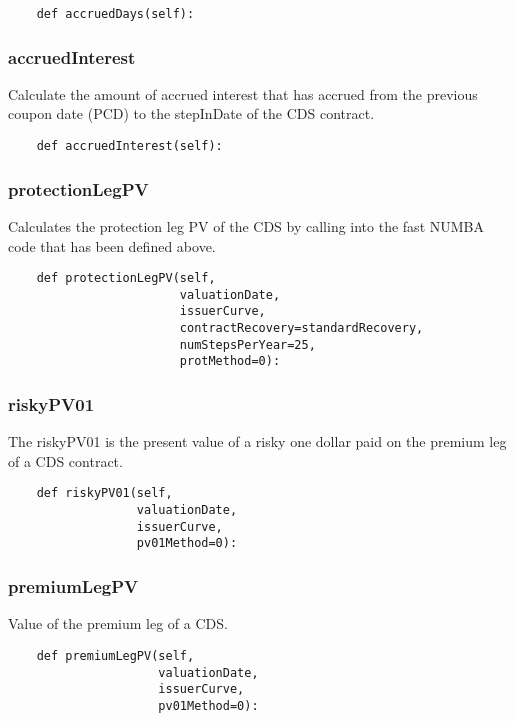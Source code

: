\documentclass[twoside,11pt]{book}
\begin{document}
\begin{lstlisting}
    def accruedDays(self):
\end{lstlisting}

\subsubsection*{{\bf accruedInterest}}
Calculate the amount of accrued interest that has accrued from the previous coupon date (PCD) to the stepInDate of the CDS contract.  

\begin{lstlisting}
    def accruedInterest(self):
\end{lstlisting}

\subsubsection*{{\bf protectionLegPV}}
Calculates the protection leg PV of the CDS by calling into the fast NUMBA code that has been defined above.  

\begin{lstlisting}
    def protectionLegPV(self,
                        valuationDate,
                        issuerCurve,
                        contractRecovery=standardRecovery,
                        numStepsPerYear=25,
                        protMethod=0):
\end{lstlisting}

\subsubsection*{{\bf riskyPV01}}
The riskyPV01 is the present value of a risky one dollar paid on the premium leg of a CDS contract.  

\begin{lstlisting}
    def riskyPV01(self,
                  valuationDate,
                  issuerCurve,
                  pv01Method=0):
\end{lstlisting}

\subsubsection*{{\bf premiumLegPV}}
Value of the premium leg of a CDS.  

\begin{lstlisting}
    def premiumLegPV(self,
                     valuationDate,
                     issuerCurve,
                     pv01Method=0):
\end{lstlisting}
\end{document}
